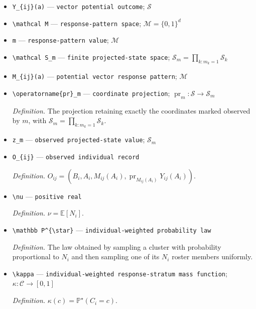 \documentclass{article}
\begin{document}
\begin{itemize}
  \item \texttt{Y\_\allowbreak{}\{ij\}\allowbreak{}(a)} --- \texttt{vector potential outcome}; \(\mathcal S\)
  \item \texttt{\textbackslash{}\allowbreak{}mathcal M} --- \texttt{response-\allowbreak{}pattern space}; \(\mathcal M=\{0,1\}^{d}\)
  \item \texttt{m} --- \texttt{response-\allowbreak{}pattern value}; \(\mathcal M\)
  \item \texttt{\textbackslash{}\allowbreak{}mathcal S\_\allowbreak{}m} --- \texttt{finite projected-\allowbreak{}state space}; \(\mathcal S_m=\prod_{k:m_k=1}\mathcal S_k\)
  \item \texttt{M\_\allowbreak{}\{ij\}\allowbreak{}(a)} --- \texttt{potential vector response pattern}; \(\mathcal M\)
  \item \texttt{\textbackslash{}\allowbreak{}operatorname\{pr\}\allowbreak{}\_\allowbreak{}m} --- \texttt{coordinate projection}; \(\operatorname{pr}_m:\mathcal S\to\mathcal S_m\)
  \par\smallskip\noindent\emph{Definition.} The projection retaining exactly the coordinates marked observed by \(m\), with \(\mathcal S_m=\prod_{k:m_k=1}\mathcal S_k\).
  \item \texttt{z\_\allowbreak{}m} --- \texttt{observed projected-\allowbreak{}state value}; \(\mathcal S_m\)
  \item \texttt{O\_\allowbreak{}\{ij\}\allowbreak{}} --- \texttt{observed individual record}
  \par\smallskip\noindent\emph{Definition.} \(O_{ij}=(B_i,A_i,M_{ij}(A_i),\operatorname{pr}_{M_{ij}(A_i)}Y_{ij}(A_i))\).
  \item \texttt{\textbackslash{}\allowbreak{}nu} --- \texttt{positive real}
  \par\smallskip\noindent\emph{Definition.} \(\nu=\mathbb E[N_i]\).
  \item \texttt{\textbackslash{}\allowbreak{}mathbb P\textasciicircum{}\{\textbackslash{}\allowbreak{}star\}\allowbreak{}} --- \texttt{individual-\allowbreak{}weighted probability law}
  \par\smallskip\noindent\emph{Definition.} The law obtained by sampling a cluster with probability proportional to \(N_i\) and then sampling one of its \(N_i\) roster members uniformly.
  \item \texttt{\textbackslash{}\allowbreak{}kappa} --- \texttt{individual-\allowbreak{}weighted response-\allowbreak{}stratum mass function}; \(\kappa:\mathcal C\to[0,1]\)
  \par\smallskip\noindent\emph{Definition.} \(\kappa(c)=\mathbb P^{\star}(C_i=c)\).

\end{itemize}
\end{document}
